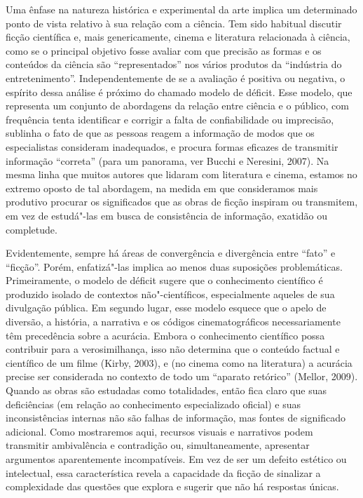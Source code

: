 Uma ênfase na natureza histórica e experimental da arte implica um
determinado ponto de vista relativo à sua relação com a ciência. Tem
sido habitual discutir ficção científica e, mais genericamente, cinema e
literatura relacionada à ciência, como se o principal objetivo fosse
avaliar com que precisão as formas e os conteúdos da ciência são
``representados'' nos vários produtos da ``indústria do
entretenimento''. Independentemente de se a avaliação é positiva ou
negativa, o espírito dessa análise é próximo do chamado modelo de
déficit. Esse modelo, que representa um conjunto de abordagens da
relação entre ciência e o público, com frequência tenta identificar e
corrigir a falta de confiabilidade ou imprecisão, sublinha o fato de que
as pessoas reagem a informação de modos que os especialistas consideram
inadequados, e procura formas eficazes de transmitir informação
``correta'' (para um panorama, ver Bucchi e Neresini, 2007). Na mesma
linha que muitos autores que lidaram com literatura e cinema, estamos no
extremo oposto de tal abordagem, na medida em que consideramos mais
produtivo procurar os significados que as obras de ficção inspiram ou
transmitem, em vez de estudá"-las em busca de consistência de informação,
exatidão ou completude.

Evidentemente, sempre há áreas de convergência e divergência entre
``fato'' e ``ficção''. Porém, enfatizá"-las implica ao menos duas
suposições problemáticas. Primeiramente, o modelo de déficit sugere que
o conhecimento científico é produzido isolado de contextos
não"-científicos, especialmente aqueles de sua divulgação pública. Em
segundo lugar, esse modelo esquece que o apelo de diversão, a história,
a narrativa e os códigos cinematográficos necessariamente têm
precedência sobre a acurácia. Embora o conhecimento científico possa
contribuir para a verosimilhança, isso não determina que o conteúdo
factual e científico de um filme (Kirby, 2003), e (no cinema como na
literatura) a acurácia precise ser considerada no contexto de todo um
``aparato retórico'' (Mellor, 2009). Quando as obras são estudadas como
totalidades, então fica claro que suas deficiências (em relação ao
conhecimento especializado oficial) e suas inconsistências internas não
são falhas de informação, mas fontes de significado adicional. Como
mostraremos aqui, recursos visuais e narrativos podem transmitir
ambivalência e contradição ou, simultaneamente, apresentar argumentos
aparentemente incompatíveis. Em vez de ser um defeito estético ou
intelectual, essa característica revela a capacidade da ficção de
sinalizar a complexidade das questões que explora e sugerir que não há
respostas únicas.

